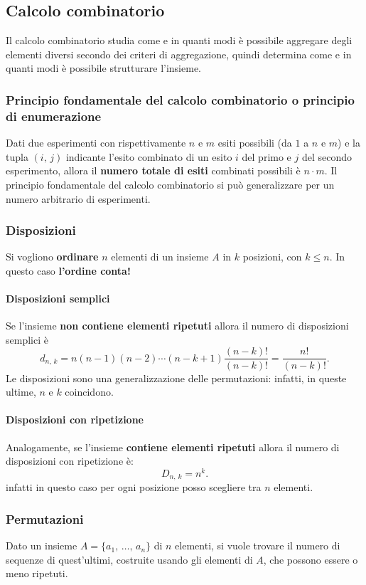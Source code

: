 \subsection{Calcolo combinatorio}
Il calcolo combinatorio studia come e in quanti modi è possibile aggregare degli elementi diversi secondo dei criteri di aggregazione, quindi determina come e in quanti modi è possibile strutturare l'insieme.

\subsubsection{Principio fondamentale del calcolo combinatorio o  principio di enumerazione}
Dati due esperimenti con rispettivamente $n$ e $m$ esiti possibili (da $1$ a $n$ e $m$) e la tupla $(i, \, j)$ indicante l'esito combinato di un esito $i$ del primo e $j$ del secondo esperimento, allora il \textbf{numero totale di esiti} combinati possibili è $n \cdot m$. Il principio fondamentale del calcolo combinatorio si può generalizzare per un numero arbitrario di esperimenti.

\subsubsection{Disposizioni}
Si vogliono \textbf{ordinare} $n$ elementi di un insieme $A$ in $k$ posizioni, con $k \leq n$.
In questo caso \textbf{l'ordine conta!}

\paragraph{Disposizioni semplici}
Se l'insieme \textbf{non contiene elementi ripetuti} allora il numero di disposizioni semplici è \[
\boxed{
d_{n, \, k} = n(n-1)(n-2) \cdots (n-k+1) \frac{(n-k)!}{(n-k)!} = \frac{n!}{(n-k)!}
}.
\]
Le disposizioni sono una generalizzazione delle permutazioni: infatti, in queste ultime, $n$ e $k$ coincidono.

\paragraph{Disposizioni con ripetizione}
Analogamente, se l'insieme \textbf{contiene elementi ripetuti} allora il numero di disposizioni con ripetizione è: \[
\boxed{
D_{n, \, k} = n^k
}.
\]
infatti in questo caso per ogni posizione posso scegliere tra $n$ elementi.

\subsubsection{Permutazioni}
Dato un insieme $A = \{ a_1, \, \dots, \, a_n \}$ di $n$ elementi, si vuole trovare il numero di sequenze di quest'ultimi, costruite usando gli elementi di $A$, che possono essere o meno ripetuti. \\

